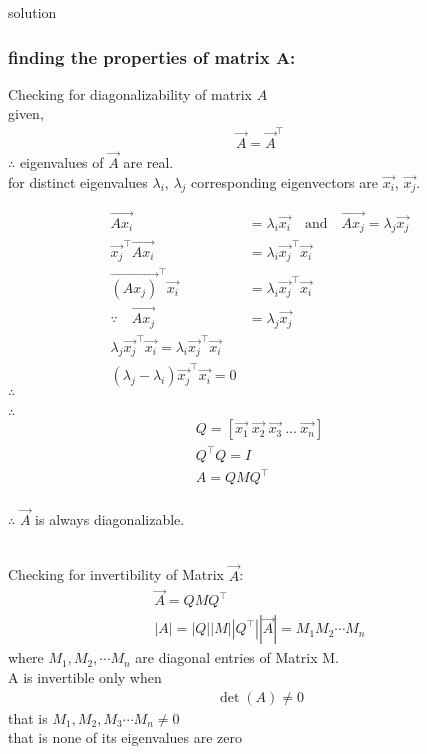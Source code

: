 \documentclass{beamer}
\begin{document}
\begin{frame}{solution}
    \frametitle{finding the properties of matrix A:}
Checking for diagonalizability of matrix $A$ \\
given,
\begin{align}
\vec{A} = \vec{A}^\top
\end{align}
$\therefore$ eigenvalues of $\vec{A}$ are real.\\
for distinct eigenvalues $\lambda_i$, $\lambda_j$ corresponding eigenvectors are $\vec{x_i}$, $\vec{x_j}$.
\end{frame}
\begin{frame}
\begin{align}
\vec{Ax_i} &= \lambda_i \vec{x_i} \quad \text{and} \quad \vec{Ax_j} = \lambda_j \vec{x_j} 
\\\vec{x_j}^\top \vec{A x_i} &= \lambda_i \vec{x_j}^\top \vec{x_i} \\
\vec{(Ax_j)}^\top \vec{x_i} &= \lambda_i \vec{x_j}^\top \vec{x_i}\\
\because \quad \vec{Ax_j} &= \lambda_j \vec{x_j}\\
\lambda_j \vec{x_j}^\top \vec{x_i} = \lambda_i \vec{x_j}^\top \vec{x_i}\\
(\lambda_j - \lambda_i) \vec{x_j}^\top \vec{x_i} = 0
\end{align}
$\therefore$ \\
\end{frame}
\begin{frame}
$\therefore$ \\
\begin{align}
Q = [\vec{x_1} \ \vec{x_2} \ \vec{x_3} \ \dots \ \vec{x_n}] \\
Q^\top Q = I\\
A = Q MQ^\top
\end{align}
\\
$\therefore$ $\vec{A}$ is always diagonalizable.\\\\
\end{frame}
\begin{frame}
Checking for invertibility of Matrix  $\vec{A}$:
\begin{align}
\vec{A} = Q M Q^\top \\|A| = |Q| |M| |Q^\top|
|\vec{A}| = M_1 M_2 \cdots M_n
\end{align}
where $M_1, M_2, \cdots M_n$ are diagonal entries of Matrix M.\\
A is invertible only when 
\begin{align}
\det(A) \neq 0 
\end{align}
that is $M_1, M_2, M_3 \cdots M_n \neq 0$ \\
that is none of its eigenvalues are zero \\
\end{frame}
\end{document}
